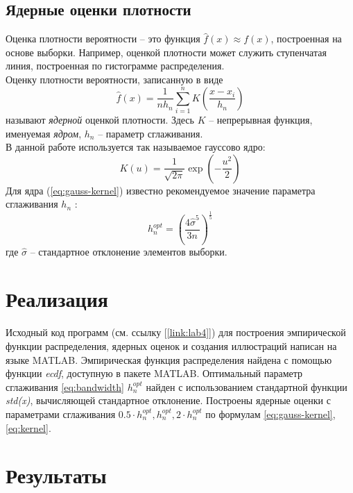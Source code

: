 \documentclass[main.tex]{subfiles}
\begin{document}
\subsection{Ядерные оценки плотности}
Оценка плотности вероятности -- это функция $\hat{f}(x) \approx f(x)$, построенная на основе выборки. Например, оценкой плотности может служить ступенчатая линия, построенная по гистограмме распределения.\\
Оценку плотности вероятности, записанную в виде
\begin{equation}\label{eq:kernel}
	\hat{f}(x) = \frac{1}{nh_n} \sum_{i=1}^{n} K\left(\frac{x-x_i}{h_n}\right)
\end{equation}
называют \emph{ядерной} оценкой плотности. Здесь $K$ -- непрерывная функция, именуемая \emph{ядром}, $h_n$ -- параметр сглаживания.\\
В данной работе используется так называемое гауссово ядро:
\begin{equation}\label{eq:gauss-kernel}
K(u) = \frac{1}{\sqrt{2\pi}} \exp(-\frac{u^2}{2})
\end{equation}
Для ядра (\ref{eq:gauss-kernel}) известно рекомендуемое значение параметра сглаживания $h_n$ \cite{maksimov_book}:
\begin{equation}\label{eq:bandwidth}
	h_n^{opt} = \left(\frac{4 \hat{\sigma}^5}{3n}\right)^{\frac{1}{5}}
\end{equation}
где $\hat{\sigma}$ -- стандартное отклонение элементов выборки.

\newpage
\section{Реализация}
Исходный код программ (см. ссылку [\ref*{link:lab4}]) для построения эмпирической функции распределения, ядерных оценок и создания иллюстраций написан на языке MATLAB. Эмпирическая функция распределения найдена с помощью функции \textit{ecdf}, доступную в пакете MATLAB. Оптимальный параметр сглаживания \eqref{eq:bandwidth} $h_n^{opt}$ найден с использованием стандартной функции \textit{std(x)}, вычисляющей стандартное отклонение. Построены ядерные оценки с параметрами сглаживания $0.5\cdot h_n^{opt}, h_n^{opt}, 2 \cdot h_n^{opt}$ по формулам \eqref{eq:gauss-kernel}, \eqref{eq:kernel}.

\newpage
\section{Результаты}

\end{document}
